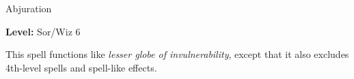 
Abjuration

\textbf{Level:} Sor/Wiz 6

This spell functions like \textit{lesser globe of invulnerability}, except that 
it also excludes 4th-level spells and spell-like effects.

